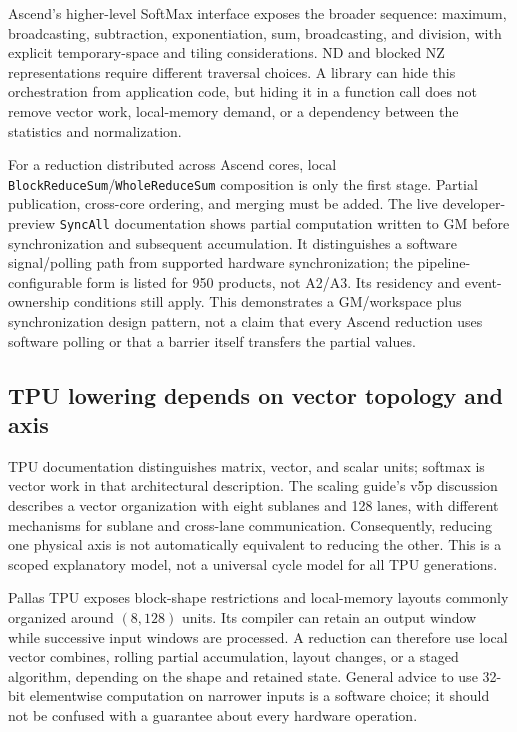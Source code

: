 Ascend's higher-level SoftMax interface exposes the broader sequence: maximum, broadcasting, subtraction, exponentiation, sum, broadcasting, and division, with explicit temporary-space and tiling considerations. ND and blocked NZ representations require different traversal choices. A library can hide this orchestration from application code, but hiding it in a function call does not remove vector work, local-memory demand, or a dependency between the statistics and normalization.~\citep{u005-ascend-softmax}

For a reduction distributed across Ascend cores, local \texttt{BlockReduceSum}/\texttt{WholeReduceSum} composition is only the first stage. Partial publication, cross-core ordering, and merging must be added. The live developer-preview \texttt{SyncAll} documentation shows partial computation written to GM before synchronization and subsequent accumulation. It distinguishes a software signal/polling path from supported hardware synchronization; the pipeline-configurable form is listed for 950 products, not A2/A3. Its residency and event-ownership conditions still apply. This demonstrates a GM/workspace plus synchronization design pattern, not a claim that every Ascend reduction uses software polling or that a barrier itself transfers the partial values.~\citep{u008_ascend_syncall}

\subsection{TPU lowering depends on vector topology and axis}

TPU documentation distinguishes matrix, vector, and scalar units; softmax is vector work in that architectural description. The scaling guide's v5p discussion describes a vector organization with eight sublanes and 128 lanes, with different mechanisms for sublane and cross-lane communication. Consequently, reducing one physical axis is not automatically equivalent to reducing the other. This is a scoped explanatory model, not a universal cycle model for all TPU generations.~\citep{u005-tpu-architecture,u005-tpu-topology}

Pallas TPU exposes block-shape restrictions and local-memory layouts commonly organized around $(8,128)$ units. Its compiler can retain an output window while successive input windows are processed. A reduction can therefore use local vector combines, rolling partial accumulation, layout changes, or a staged algorithm, depending on the shape and retained state. General advice to use 32-bit elementwise computation on narrower inputs is a software choice; it should not be confused with a guarantee about every hardware operation.~\citep{u005-pallas-details}

